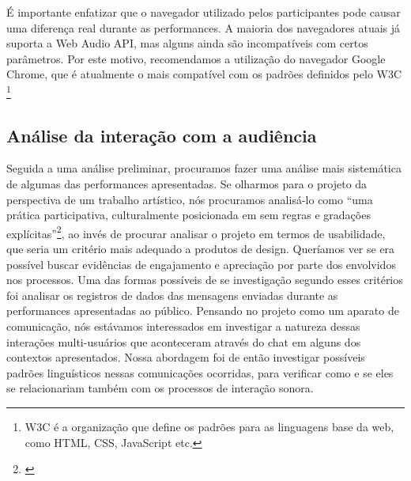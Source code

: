
É importante enfatizar que o navegador utilizado pelos participantes pode causar uma diferença real durante as performances. A maioria dos navegadores atuais já suporta a Web Audio API, mas alguns ainda são incompatíveis com certos parâmetros. Por este motivo, recomendamos a utilização do navegador Google Chrome, que é atualmente o mais compatível com os padrões definidos pelo W3C \footnote{W3C é a organização que define os padrões para as linguagens base da web, como HTML, CSS, JavaScript etc.}


%


\subsection{Análise da interação com a audiência}

Seguida a uma análise preliminar, procuramos fazer uma análise mais sistemática de algumas das performances apresentadas. Se olharmos para o projeto da perspectiva de um trabalho artístico, nós procuramos analisá-lo como ``uma prática participativa, culturalmente posicionada em sem regras e gradações explícitas''\footnote{\cite{McCullough1998}}, ao invés de procurar analisar o projeto em termos de usabilidade, que seria um critério mais adequado a produtos de design. Queríamos ver se era possível buscar evidências de engajamento e apreciação por parte dos envolvidos nos processos. Uma das formas possíveis de se investigação segundo esses critérios foi analisar os registros de dados das mensagens enviadas durante as performances apresentadas ao público. Pensando no projeto como um aparato de comunicação, nós estávamos interessados em investigar a natureza dessas interações multi-usuários que aconteceram através do chat em alguns dos contextos apresentados. Nossa abordagem foi de então investigar possíveis padrões linguísticos nessas comunicações ocorridas, para verificar como e se eles se relacionariam também com os processos de interação sonora.


